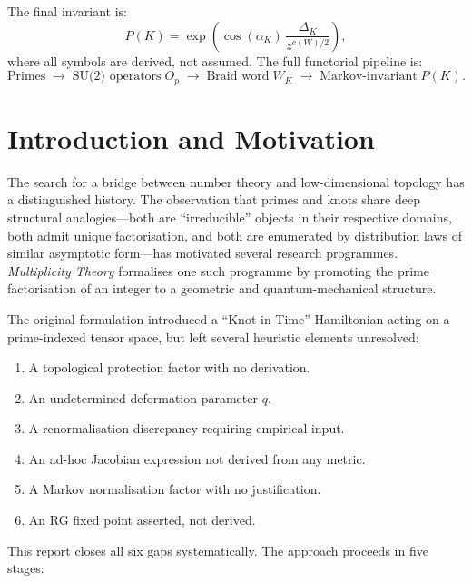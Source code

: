 \documentclass[11pt]{article}
\begin{document}
The final invariant is:
\[
P(K) = \exp\!\left(\cos(\alpha_K)\,\frac{\Delta_K}{z^{c(W)/2}}\right),
\]
where all symbols are derived, not assumed. The full functorial pipeline is:
\[
\text{Primes}
\;\longrightarrow\;
\text{SU(2) operators}\;O_p
\;\longrightarrow\;
\text{Braid word}\;W_K
\;\longrightarrow\;
\text{Markov-invariant}\;P(K).
\]


\newpage
\tableofcontents
\newpage

\section{Introduction and Motivation}

The search for a bridge between number theory and low-dimensional topology has a distinguished history. The observation that primes and knots share deep structural analogies---both are ``irreducible'' objects in their respective domains, both admit unique factorisation, and both are enumerated by distribution laws of similar asymptotic form---has motivated several research programmes. \emph{Multiplicity Theory} formalises one such programme by promoting the prime factorisation of an integer to a geometric and quantum-mechanical structure.

The original formulation introduced a ``Knot-in-Time'' Hamiltonian acting on a prime-indexed tensor space, but left several heuristic elements unresolved:

\begin{enumerate}
  \item A topological protection factor with no derivation.
  \item An undetermined deformation parameter $q$.
  \item A renormalisation discrepancy requiring empirical input.
  \item An ad-hoc Jacobian expression not derived from any metric.
  \item A Markov normalisation factor with no justification.
  \item An RG fixed point asserted, not derived.
\end{enumerate}

This report closes all six gaps systematically. The approach proceeds in five stages:
\end{document}
